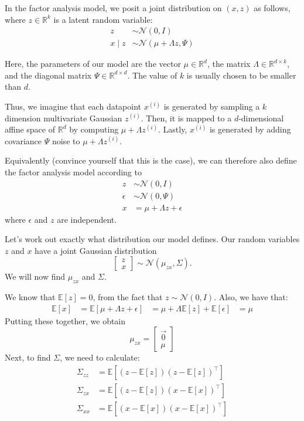 \vspace{1cm}
In the factor analysis model, we posit a joint distribution on $(x, z)$ as follows,
where $z \in \mathbb R^k$ is a latent random variable:
\begin{align*}
    z &\sim \mathcal N (0, I)\\
    x \mid z &\sim \mathcal N (\mu + \Lambda z, \Psi)
\end{align*}

Here, the parameters of our model are the vector $\mu \in \mathbb R^d$, the matrix
$\Lambda \in \mathbb R^{d \times k}$, and the diagonal matrix $\Psi \in \mathbb R^{d \times d}$.
The value of $k$ is usually chosen to be smaller than $d$.

Thus, we imagine that each datapoint $x^{(i)}$
is generated by sampling a $k$ dimension multivariate Gaussian $z^{(i)}$. Then, it is mapped to a $d$-dimensional
affine space of $\mathbb R^d$ by computing $\mu + \Lambda z^{(i)}$. Lastly, $x^{(i)}$
is generated by adding covariance $\Psi$ noise to $\mu + \Lambda z^{(i)}$.

Equivalently (convince yourself that this is the case), we can therefore
also define the factor analysis model according to
\begin{align*}
    z &\sim \mathcal N(0, I)\\
    \epsilon &\sim \mathcal N (0, \Psi)\\
    x &= \mu + \Lambda z + \epsilon
\end{align*}
where $\epsilon$ and $z$ are independent.

Let's work out exactly what distribution our model defines. Our random
variables $z$ and $x$ have a joint Gaussian distribution
\[
\begin{bmatrix}
    z\\
    x
\end{bmatrix} \sim \mathcal N (\mu_{zx}, \Sigma).
\]
We will now find $\mu_{zx}$ and $\Sigma$.

We know that $\mathbb E[z] = 0$, from the fact that $z \sim \mathcal N (0, I)$. Also, we have
that:
\begin{align*}
    \mathbb E[x] &= \mathbb E[\mu + \Lambda z + \epsilon]
        &= \mu + \Lambda \mathbb E[z] + \mathbb E[\epsilon]
        &= \mu
\end{align*}
Putting these together, we obtain
\[
\mu_{zx} =
\begin{bmatrix}
    \vec{0}\\
    \mu    
\end{bmatrix}
\]
Next, to find $\Sigma$, we need to calculate:
\begin{align*} %
    \Sigma_{zz} &= \mathbb E[(z - \mathbb E[z])(z - \mathbb E[z])^\top] \tag{the upper-left block of $\Sigma$}\\
    \Sigma_{zx} &= \mathbb E[(z - \mathbb E[z])(x - \mathbb E[x])^\top] \tag{upper-right block}\\
    \Sigma_{xx} &= \mathbb E[(x - \mathbb E[x])(x - \mathbb E[x])^\top] \tag{lower-right block}
\end{align*}

